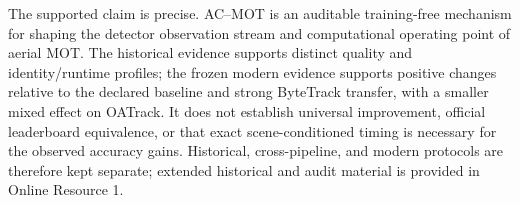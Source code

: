 The supported claim is precise. AC--MOT is an auditable training-free mechanism
for shaping the detector observation stream and computational operating point
of aerial MOT. The historical evidence supports distinct quality and
identity/runtime profiles; the frozen modern evidence supports positive changes
relative to the declared baseline and strong ByteTrack transfer, with a smaller
mixed effect on OATrack. It does not establish universal improvement, official
leaderboard equivalence, or that exact scene-conditioned timing is necessary
for the observed accuracy gains. Historical, cross-pipeline, and modern
protocols are therefore kept separate; extended historical and audit material
is provided in Online Resource 1.
